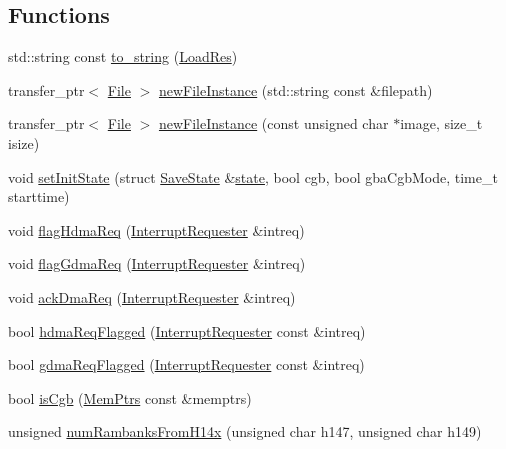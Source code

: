 \subsection*{Functions}
\begin{DoxyCompactItemize}
\item 
std\+::string const \hyperlink{namespacegambatte_a81e70a62a5953ed57b464432a55d1441}{to\+\_\+string} (\hyperlink{namespacegambatte_a42606f494711d2e2870a5f5cdf69e468}{Load\+Res})
\item 
transfer\+\_\+ptr$<$ \hyperlink{classgambatte_1_1File}{File} $>$ \hyperlink{namespacegambatte_a51d0f5378b3d6fdb328a94ba700b1560}{new\+File\+Instance} (std\+::string const \&filepath)
\item 
transfer\+\_\+ptr$<$ \hyperlink{classgambatte_1_1File}{File} $>$ \hyperlink{namespacegambatte_a3188aac596e08a6a6aad75a00b50abdb}{new\+File\+Instance} (const unsigned char $\ast$image, size\+\_\+t isize)
\item 
void \hyperlink{namespacegambatte_a3ff886783768784148684a65f48c0b72}{set\+Init\+State} (struct \hyperlink{structgambatte_1_1SaveState}{Save\+State} \&\hyperlink{ppu_8cpp_a2f2eca6997ee7baf8901725ae074d45b}{state}, bool cgb, bool gba\+Cgb\+Mode, time\+\_\+t starttime)
\item 
void \hyperlink{namespacegambatte_a76b56771c7cc51d5a2a9d5158512becc}{flag\+Hdma\+Req} (\hyperlink{classgambatte_1_1InterruptRequester}{Interrupt\+Requester} \&intreq)
\item 
void \hyperlink{namespacegambatte_abe41c47543f1ab3aafbee53c0ef50eb6}{flag\+Gdma\+Req} (\hyperlink{classgambatte_1_1InterruptRequester}{Interrupt\+Requester} \&intreq)
\item 
void \hyperlink{namespacegambatte_ab20962387ab0fea218f5630b620560c2}{ack\+Dma\+Req} (\hyperlink{classgambatte_1_1InterruptRequester}{Interrupt\+Requester} \&intreq)
\item 
bool \hyperlink{namespacegambatte_ad50312ad0ce301d07f221e2161db6476}{hdma\+Req\+Flagged} (\hyperlink{classgambatte_1_1InterruptRequester}{Interrupt\+Requester} const \&intreq)
\item 
bool \hyperlink{namespacegambatte_a9ad0a8b7b8c1a34bfc2525dece4a0404}{gdma\+Req\+Flagged} (\hyperlink{classgambatte_1_1InterruptRequester}{Interrupt\+Requester} const \&intreq)
\item 
bool \hyperlink{namespacegambatte_ab1d61954307082098268b1f79c08e83a}{is\+Cgb} (\hyperlink{classgambatte_1_1MemPtrs}{Mem\+Ptrs} const \&memptrs)
\item 
unsigned \hyperlink{namespacegambatte_a1d7fcd1621b17c908a7ea14dfcb98b10}{num\+Rambanks\+From\+H14x} (unsigned char h147, unsigned char h149)

\end{DoxyCompactItemize}
